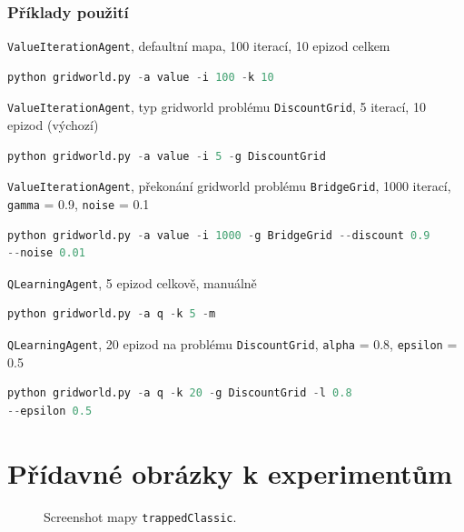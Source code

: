 \subsection{Příklady použití}
\texttt{ValueIterationAgent}, defaultní mapa, 100 iterací, 10 epizod celkem
\begin{lstlisting}[language=Python,texcl=true]
python gridworld.py -a value -i 100 -k 10
\end{lstlisting}
\texttt{ValueIterationAgent}, typ gridworld problému \texttt{DiscountGrid}, 5 iterací, 10 epizod (výchozí)
\begin{lstlisting}[language=Python,texcl=true]
python gridworld.py -a value -i 5 -g DiscountGrid
\end{lstlisting}
\texttt{ValueIterationAgent}, překonání gridworld problému \texttt{BridgeGrid}, 1000 iterací, \texttt{gamma} = 0.9, \texttt{noise} =  0.1
\begin{lstlisting}[language=Python,texcl=true]
python gridworld.py -a value -i 1000 -g BridgeGrid --discount 0.9
--noise 0.01
\end{lstlisting}
\texttt{QLearningAgent}, 5 epizod celkově, manuálně
\begin{lstlisting}[language=Python,texcl=true]
python gridworld.py -a q -k 5 -m
\end{lstlisting}
\texttt{QLearningAgent}, 20 epizod na problému \texttt{DiscountGrid}, \texttt{alpha} = 0.8, \texttt{epsilon} = 0.5
\begin{lstlisting}[language=Python,texcl=true]
python gridworld.py -a q -k 20 -g DiscountGrid -l 0.8
--epsilon 0.5
\end{lstlisting}

\chapter{Přídavné obrázky k experimentům}
\label{pril:experobr}
\begin{figure}[!htbp]
\begin{center}
  \caption{Screenshot mapy \texttt{trappedClassic}.}
  \label{img:trapped}
\end{center}
\end{figure}


